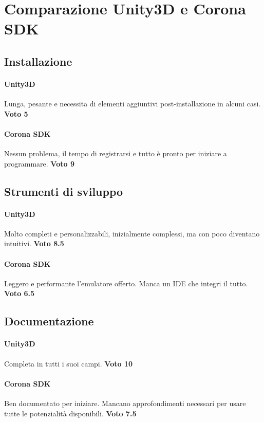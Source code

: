 
\newpage

\section{Comparazione Unity3D e Corona SDK}
\label{sec:final}

	\subsection*{Installazione}
		\paragraph{Unity3D} Lunga, pesante e necessita di elementi aggiuntivi post-installazione in alcuni casi. \textbf{Voto 5}
		\paragraph{Corona SDK} Nessun problema, il tempo di registrarsi e tutto è pronto per iniziare a programmare. \textbf{Voto 9}
		
	\subsection*{Strumenti di sviluppo}
		\paragraph{Unity3D} Molto completi e personalizzabili, inizialmente complessi, ma con poco diventano intuitivi. \textbf{Voto 8.5}
		\paragraph{Corona SDK} Leggero e performante l'emulatore offerto. Manca un IDE che integri il tutto. \textbf{Voto 6.5}
	
	\subsection*{Documentazione}
		\paragraph{Unity3D} Completa in tutti i suoi campi. \textbf{Voto 10}
		
		\paragraph{Corona SDK} Ben documentato per iniziare. Mancano approfondimenti necessari per usare tutte le potenzialità disponibili. \textbf{Voto 7.5}
	
